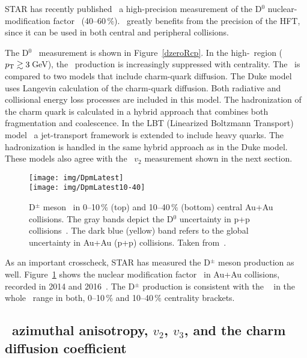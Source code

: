 STAR has recently published~\cite{D0paper} a high-precision measurement of the D$^0$  nuclear-modification factor \Rcp\ (40--60$\,\%$)\@. \Rcp\ greatly benefits from the precision of the HFT, since it can be used in both central and peripheral collisions.

The D$^0$ \Rcp\ measurement is shown in Figure~\ref{dzeroRcp}. In the high-\pt\ region (${p_{\mathrm{T}}} \gtrsim 3\,$GeV), the \dzero\ production is increasingly suppressed with centrality. The \Rcp\ is compared to two models that include charm-quark diffusion. The Duke model~\cite{Duke, Duke2015} uses Langevin calculation of the charm-quark diffusion. Both radiative and collisional energy loss processes are included in this model. The hadronization of the charm quark is calculated in a hybrid approach that combines both fragmentation and coalescence. In the LBT (Linearized Boltzmann Transport) model~\cite{LBT, LBTprivate} a jet-transport framework is extended to include heavy quarks. The hadronization is handled in the same hybrid approach as in the Duke model. These models also agree with the \dzero\ $v_2$ measurement shown in the next section.


\begin{figure}[!htb]
\begin{center}
 \texttt{[image: img/DpmLatest]}\\
 \texttt{[image: img/DpmLatest10-40]}\\
\end{center}
\caption[D$^\pm$ meson \Raa\ in 0--10$\,\%$ and 10--40$\,\%$ central Au+Au collisions.]{\label{dpm} D$^\pm$ meson \Raa\ in 0--10$\,\%$ (top) and 10--40$\,\%$ (bottom) central Au+Au collisions. The gray bands depict the D$^0$ uncertainty in p+p collisions~\cite{flashTalkICHEPVanek,D0paper}. The dark blue (yellow) band refers to the global uncertainty in Au+Au (p+p) collisions. Taken from~\cite{flashTalkICHEPVanek}\@.}
\end{figure}


As an important crosscheck, STAR has measured the D$^\pm$ meson production as well. Figure~\ref{dpm} shows the nuclear modification factor \Raa\ in Au+Au collisions, recorded in 2014 and 2016~\cite{flashTalkICHEPVanek}\@. The D$^\pm$ production is consistent with the \dzero~\cite{D0paper} in the whole \pt\ range in both, 0--10$\,\%$ and 10--40$\,\%$ centrality brackets.

\subsection{\dzero\ azimuthal anisotropy, $v_2$, $v_3$, and the charm diffusion coefficient}

